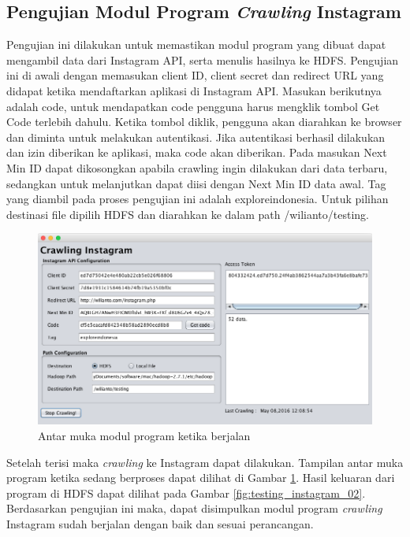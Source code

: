 \subsection{Pengujian Modul Program \textit{Crawling} Instagram}
Pengujian ini dilakukan untuk memastikan modul program yang dibuat dapat mengambil data dari Instagram API, serta menulis hasilnya ke HDFS. Pengujian ini di awali dengan memasukan client ID, client secret dan redirect URL yang didapat ketika mendaftarkan aplikasi di Instagram API. Masukan berikutnya adalah code, untuk mendapatkan code pengguna harus mengklik tombol Get Code terlebih dahulu. Ketika tombol diklik, pengguna akan diarahkan ke browser dan diminta untuk melakukan autentikasi. Jika autentikasi berhasil dilakukan dan izin diberikan ke aplikasi, maka code akan diberikan. Pada masukan Next Min ID dapat dikosongkan apabila crawling ingin dilakukan dari data terbaru, sedangkan untuk melanjutkan dapat diisi dengan Next Min ID data awal. Tag yang diambil pada proses pengujian ini adalah exploreindonesia. Untuk pilihan destinasi file dipilih HDFS dan diarahkan ke dalam path /wilianto/testing. 

\begin{figure}[H]
	\centering
	\includegraphics[scale=0.5]{Gambar/testing-instagram-01.png}
	\caption[Antar muka modul program ketika berjalan]{Antar muka modul program ketika berjalan} 
	\label{fig:testing_instagram_01}
\end{figure}

Setelah terisi maka \textit{crawling} ke Instagram dapat dilakukan. Tampilan antar muka program ketika sedang berproses dapat dilihat di Gambar \ref{fig:testing_instagram_01}. Hasil keluaran dari program di HDFS dapat dilihat pada Gambar \ref{fig:testing_instagram_02}. Berdasarkan pengujian ini maka, dapat disimpulkan modul program \textit{crawling} Instagram sudah berjalan dengan baik dan sesuai perancangan.

